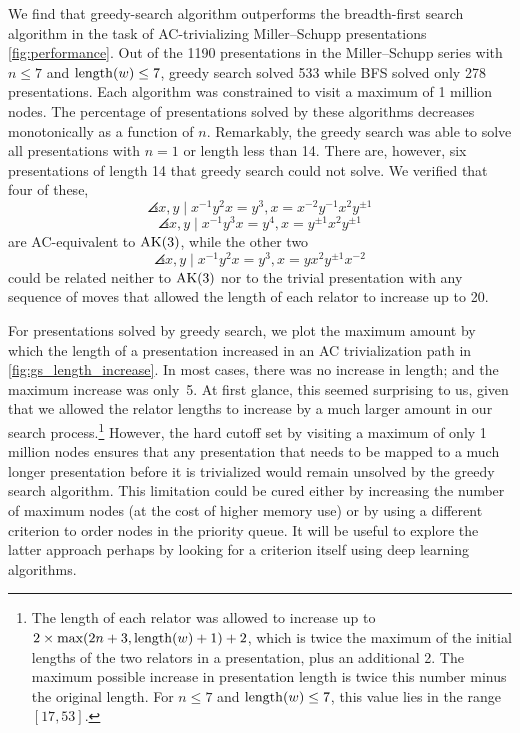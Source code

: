 We find that greedy-search algorithm outperforms the breadth-first search algorithm in the task of AC-trivializing Miller--Schupp presentations \autoref{fig:performance}.
Out of the 1190 presentations in the Miller--Schupp series with $n \leq 7$ and $\operatorname{length}(w) \leq 7$, greedy search solved 533 while BFS solved only 278 presentations.
Each algorithm was constrained to visit a maximum of 1 million nodes.
The percentage of presentations solved by these algorithms decreases monotonically as a function of $n$.
Remarkably, the greedy search was able to solve all presentations with $n=1$ or length less than 14.
There are, however, six presentations of length 14 that greedy search could not solve.
We verified that four of these,
\[
\angles{x, y \mid x^{-1} y^2 x = y^{3} , x = x^{-2} y^{-1} x^2 y^{\pm 1}}
\]
\[
\angles{x, y \mid x^{-1} y^3 x = y^{4} , x = y^{\pm 1} x^2 y^{\pm 1}}
\]
are AC-equivalent to $\text{AK}(3)$, while the other two
\[
\angles{x, y \mid x^{-1} y^2 x = y^{3} , x = y x^2 y^{\pm 1} x^{-2}}
\]
could be related neither to $\text{AK}(3)$ nor to the trivial presentation with any sequence of moves that allowed the length of each relator to increase up to 20.

For presentations solved by greedy search, we plot the maximum amount by which the length of a presentation increased in an AC trivialization path in \autoref{fig:gs_length_increase}.
In most cases, there was no increase in length; and the maximum increase was only~5.
At first glance, this seemed surprising to us, given that we allowed the relator lengths to increase by a much larger amount in our search process.\footnote{The length of each relator was allowed to increase up to \(2 \times \text{max}(2n+3, \operatorname{length}(w)+1) + 2\), which is twice the maximum of the initial lengths of the two relators in a presentation, plus an additional 2.
The maximum possible increase in presentation length is twice this number minus the original length.
For $n \leq 7$ and $\operatorname{length}(w) \leq 7$, this value lies in the range $[17, 53]$.}
However, the hard cutoff set by visiting a maximum of only 1 million nodes ensures that any presentation that needs to be mapped to a much longer presentation before it is trivialized would remain unsolved by the greedy search algorithm.
This limitation could be cured either by increasing the number of maximum nodes (at the cost of higher memory use) or by using a different criterion to order nodes in the priority queue.
It will be useful to explore the latter approach perhaps by looking for a criterion itself using deep learning algorithms.

